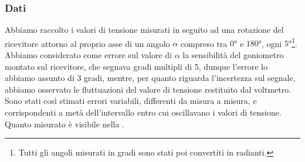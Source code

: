 \documentclass[a4paper]{article}
\begin{document}
\subsubsection{Dati}
Abbiamo raccolto i valori di tensione misurati in seguito ad una rotazione del ricevitore attorno al proprio asse di un angolo $\alpha$ compreso tra $\ang{0}$ e $\ang{180}$, ogni $\ang{5}$\footnote{Tutti gli angoli misurati in gradi sono stati poi convertiti in radianti.}. Abbiamo considerato come errore sul valore di $\alpha$ la sensibilità del goniometro montato sul ricevitore, che segnava gradi multipli di 5, dunque l'errore lo abbiamo assunto di 3 gradi, mentre, per quanto riguarda l'incertezza sul segnale, abbiamo osservato le fluttuazioni del valore di tensione restituito dal voltmetro. Sono stati così stimati errori variabili, differenti da misura a misura, e corrispondenti a metà dell'intervallo entro cui oscillavano i valori di tensione.
Quanto misurato è visibile nella .
\end{document}
